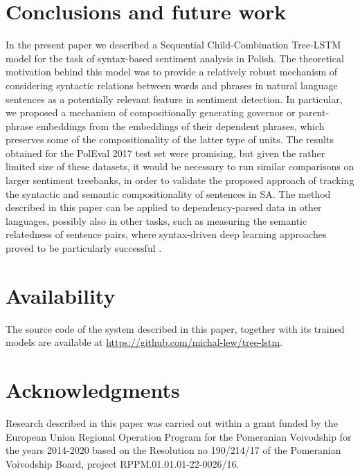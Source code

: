 \documentclass[10pt, a4paper]{article}
\begin{document}
\section{Conclusions and future work}

In the present paper we described a Sequential Child-Combination Tree-LSTM model for the task of syntax-based sentiment analysis in Polish. The theoretical motivation behind this model was to provide a relatively robust mechanism of considering syntactic relations between words and phrases in natural language sentences as a potentially relevant feature in sentiment detection. In particular, we proposed a mechanism of compositionally generating governor or parent-phrase embeddings from the embeddings of their dependent phrases, which preserves some of the compositionality of the latter type of units. The results obtained for the PolEval 2017 test set were promising, but given the rather limited size of these datasets, it would be necessary to run similar comparisons on larger sentiment treebanks, in order to validate the proposed approach of tracking the syntactic and semantic compositionality of sentences in SA. The method described in this paper can be applied to dependency-parsed data in other languages, possibly also in other tasks, such as measuring the semantic relatedness of sentence pairs, where syntax-driven deep learning approaches proved to be particularly successful \cite{tai2015improved}.
\section{Availability}

The source code of the system described in this paper, together with its trained models are available at \url{https://github.com/michal-lew/tree-lstm}.


\section{Acknowledgments}

Research described in this paper was carried out within a grant funded
by the European Union Regional Operation Program for
the Pomeranian Voivodship for the years 2014-2020 based on
the Resolution no 190/214/17 of the Pomeranian Voivodship
Board, project RPPM.01.01.01-22-0026/16.


 
\end{document}
